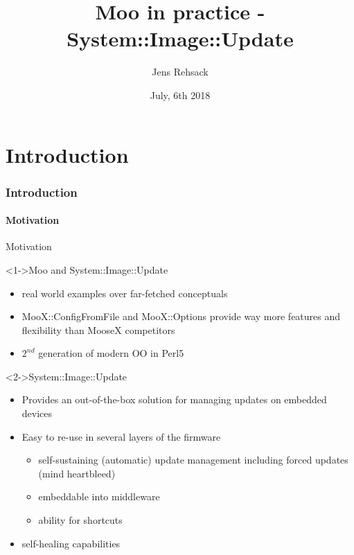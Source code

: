 \documentclass[ngerman,xcolor={table,dvipsnames},smaller,compress,hyperref={bookmarks,colorlinks}]{beamer}%
\title{Moo in practice - System::Image::Update}
\author{Jens Rehsack}
\institute[Niederrhein.PM]{Netherlands Perl Workshop}
\date{July, 6th 2018}
\begin{document}


\frame{\maketitle}

\part{Introduction}

\section{Introduction}

\subsection{Motivation}

\begin{frame}[t,fragile]{Motivation}

\begin{block}<1->{Moo and System::Image::Update}
\begin{itemize}
\item real world examples over far-fetched conceptuals
\item MooX::ConfigFromFile and MooX::Options provide way more features and flexibility than MooseX competitors
\item $ 2^{nd} $ generation of modern OO in Perl5
\end{itemize}
\end{block}

\begin{block}<2->{System::Image::Update}
\begin{itemize}
\item Provides an out-of-the-box solution for managing updates on embedded devices
\item Easy to re-use in several layers of the firmware
    \begin{itemize}
    \item self-sustaining (automatic) update management including forced updates (mind heartbleed)
    \item embeddable into middleware
    \item ability for shortcuts
    \end{itemize}
\item self-healing capabilities
\end{itemize}
\end{block}

\end{frame}
\end{document}
